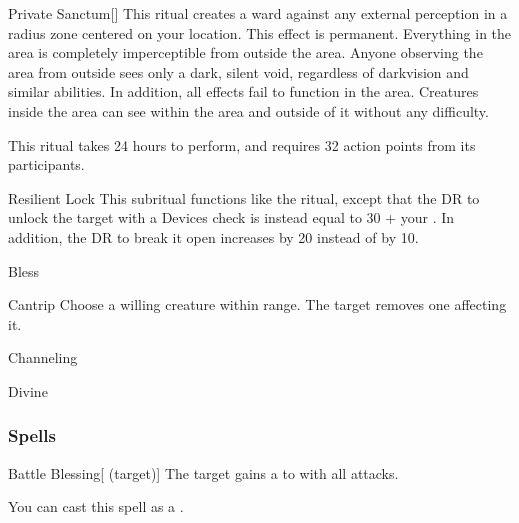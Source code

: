 \begin{ability}[\nth{4}]{Private Sanctum}[]
This ritual creates a ward against any external perception in a \arealarge radius zone centered on your location.
This effect is permanent.
Everything in the area is completely imperceptible from outside the area.
Anyone observing the area from outside sees only a dark, silent void, regardless of darkvision and similar abilities.
In addition, all  effects fail to function in the area.
Creatures inside the area can see within the area and outside of it without any difficulty.

This ritual takes 24 hours to perform, and requires 32 action points from its participants.
\end{ability}
\vspace{0.25em}



\begin{ability}[\nth{4}]{Resilient Lock}
This subritual functions like the  ritual, except that the DR to unlock the target with a Devices check is instead equal to 30 + your .
In addition, the DR to break it open increases by 20 instead of by 10.
\end{ability}
\vspace{0.25em}


\newpage
\begin{spellsection}{Bless}

\begin{spellheader}
\end{spellheader}


\begin{ability}{Cantrip}
Choose a willing creature within \rngclose range.
The target removes one  affecting it.
\end{ability}




 Channeling

 Divine
\end{spellsection}


\subsubsection{Spells}


\begin{ability}[\nth{1}]{Battle Blessing}[ (target)]
The target gains a   to  with all attacks.

You can cast this spell as a .
\end{ability}
\vspace{0.25em}



